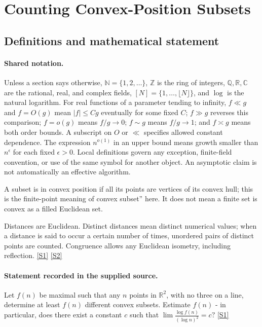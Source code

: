 \documentclass[11pt,a4paper]{article}
\newcommand{\N}{\mathbb{N}}
\newcommand{\Z}{\mathbb{Z}}
\newcommand{\Q}{\mathbb{Q}}
\newcommand{\R}{\mathbb{R}}
\newcommand{\C}{\mathbb{C}}
\newcommand{\sref}[2]{\hyperlink{source:#1:#2}{[S#2]}}
\begin{document}
\section{Counting Convex-Position Subsets}\label{statement}


\subsection{Definitions and mathematical statement}

\paragraph{Shared notation.}Unless a section says otherwise, $\N=\{1,2,\ldots\}$,
$\Z$ is the ring of integers, $\Q,\R,\C$ are the rational, real, and complex
fields, $[N]=\{1,\ldots,\lfloor N\rfloor\}$, and $\log$ is the natural
logarithm. For real functions of a parameter tending to infinity,
$f\ll g$ and $f=O(g)$ mean $|f|\leq Cg$ eventually for some fixed $C$;
$f\gg g$ reverses this comparison; $f=o(g)$ means $f/g\to0$;
$f\sim g$ means $f/g\to1$; and $f\asymp g$ means both order bounds.
A subscript on $O$ or $\ll$ specifies allowed constant dependence.
The expression $n^{o(1)}$ in an upper bound means growth smaller than
$n^\epsilon$ for each fixed $\epsilon>0$. Local definitions govern any
exception, finite-field convention, or use of the same symbol for another
object. An asymptotic claim is not automatically an effective algorithm.



A subset is in convex position if all its points are vertices of its convex hull; this is the finite-point meaning of convex subset'' here. It does not mean a finite set is convex as a filled Euclidean set.

Distances are Euclidean. Distinct distances mean distinct numerical values; when a distance is said to occur a certain number of times, unordered pairs of distinct points are counted. Congruence allows any Euclidean isometry, including reflection. \sref{statement}{1} \sref{statement}{2}

\paragraph{Statement recorded in the supplied source.}
Let $f(n)$ be maximal such that any $n$ points in $\mathbb{R}^2$, with no three on a line, determine at least $f(n)$ different convex subsets. Estimate $f(n)$ - in particular, does there exist a constant $c$ such that $ \lim \frac{\log f(n)}{(\log n)^2}=c? $ \sref{statement}{1}
\end{document}
